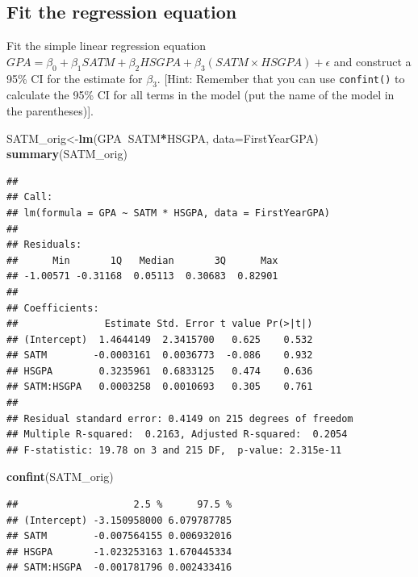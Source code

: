 \documentclass[]{article}
\newenvironment{Shaded}{\begin{snugshade}}{\end{snugshade}}
\newcommand{\DataTypeTok}[1]{\textcolor[rgb]{0.13,0.29,0.53}{#1}}
\newcommand{\KeywordTok}[1]{\textcolor[rgb]{0.13,0.29,0.53}{\textbf{#1}}}
\newcommand{\NormalTok}[1]{#1}
\newcommand{\OperatorTok}[1]{\textcolor[rgb]{0.81,0.36,0.00}{\textbf{#1}}}
\begin{document}
\hypertarget{fit-the-regression-equation}{%
\subsection{Fit the regression
equation}\label{fit-the-regression-equation}}

Fit the simple linear regression equation
\(GPA=\beta_0+\beta_1 SATM + \beta_2 HSGPA+ \beta_3 (SATM \times HSGPA) + \epsilon\)
and construct a 95\% CI for the estimate for \(\beta_3\). {[}Hint:
Remember that you can use \texttt{confint()} to calculate the 95\% CI
for all terms in the model (put the name of the model in the
parentheses){]}.

\begin{Shaded}
\begin{Highlighting}[]
\NormalTok{SATM_orig<-}\KeywordTok{lm}\NormalTok{(GPA}\OperatorTok{~}\NormalTok{SATM}\OperatorTok{*}\NormalTok{HSGPA, }\DataTypeTok{data=}\NormalTok{FirstYearGPA)}
\KeywordTok{summary}\NormalTok{(SATM_orig)}
\end{Highlighting}
\end{Shaded}

\begin{verbatim}
## 
## Call:
## lm(formula = GPA ~ SATM * HSGPA, data = FirstYearGPA)
## 
## Residuals:
##      Min       1Q   Median       3Q      Max 
## -1.00571 -0.31168  0.05113  0.30683  0.82901 
## 
## Coefficients:
##               Estimate Std. Error t value Pr(>|t|)
## (Intercept)  1.4644149  2.3415700   0.625    0.532
## SATM        -0.0003161  0.0036773  -0.086    0.932
## HSGPA        0.3235961  0.6833125   0.474    0.636
## SATM:HSGPA   0.0003258  0.0010693   0.305    0.761
## 
## Residual standard error: 0.4149 on 215 degrees of freedom
## Multiple R-squared:  0.2163, Adjusted R-squared:  0.2054 
## F-statistic: 19.78 on 3 and 215 DF,  p-value: 2.315e-11
\end{verbatim}

\begin{Shaded}
\begin{Highlighting}[]
\KeywordTok{confint}\NormalTok{(SATM_orig)}
\end{Highlighting}
\end{Shaded}

\begin{verbatim}
##                    2.5 %      97.5 %
## (Intercept) -3.150958000 6.079787785
## SATM        -0.007564155 0.006932016
## HSGPA       -1.023253163 1.670445334
## SATM:HSGPA  -0.001781796 0.002433416
\end{verbatim}
\end{document}
